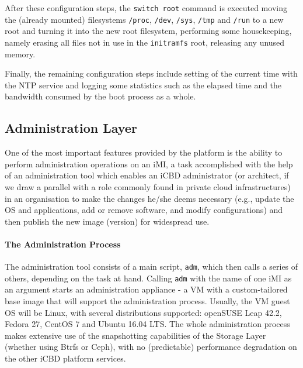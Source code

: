 After these configuration steps, the \texttt{switch root} command is executed moving the (already mounted) filesystems \texttt{/proc}, \texttt{/dev}, \texttt{/sys}, \texttt{/tmp} and \texttt{/run} to a new root and turning it into the new root filesystem, performing some housekeeping, namely erasing all files not in use in the \texttt{initramfs} root, releasing any unused memory.

Finally, the remaining configuration steps include setting of the current time with the NTP service and logging some statistics such as the elapsed time and the bandwidth consumed by the boot process as a whole.



\subsection{Administration Layer}
\label{sub:icbd_adm_layer}

One of the most important features provided by the platform is the ability to perform administration operations on an iMI, a task accomplished with the help of an administration tool which enables an iCBD administrator (or architect, if we draw a parallel with a role commonly found in private cloud infrastructures) in an organisation to make the changes he/she deems necessary (e.g., update the OS and applications, add or remove software, and modify configurations) and then publish the new image (version) for widespread use.




\paragraph{The Administration Process}
\label{par:admin_imi}

The administration tool consists of a main script, \texttt{adm}, which then calls a series of others, depending on the task at hand. Calling \texttt{adm} with the name of one iMI as an argument starts an administration appliance - a VM with a custom-tailored base image that will support the administration process. Usually, the VM guest OS will be Linux, with several distributions supported: openSUSE Leap 42.2, Fedora 27, CentOS 7 and Ubuntu 16.04 LTS. The whole administration process makes extensive use of the snapshotting capabilities of the Storage Layer (whether using Btrfs or Ceph), with no (predictable) performance degradation on the other iCBD platform services.

